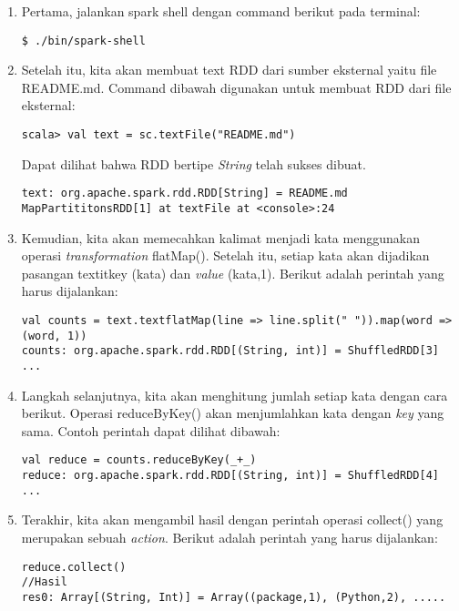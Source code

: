 \begin{enumerate}

\item Pertama, jalankan spark shell dengan command berikut pada terminal:

\begin{verbatim}
$ ./bin/spark-shell
\end{verbatim}

\item Setelah itu, kita akan membuat text RDD dari sumber eksternal yaitu file README.md. Command dibawah digunakan untuk membuat RDD dari file eksternal:

\begin{verbatim}
scala> val text = sc.textFile("README.md") 
\end{verbatim}

Dapat dilihat bahwa RDD bertipe \textit{String} telah sukses dibuat.

\begin{verbatim}
text: org.apache.spark.rdd.RDD[String] = README.md MapPartititonsRDD[1] at textFile at <console>:24
\end{verbatim}


\item Kemudian, kita akan memecahkan kalimat menjadi kata menggunakan operasi \textit{transformation} flatMap(). Setelah itu, setiap kata akan dijadikan pasangan textit{key} (kata) dan \textit{value} (kata,1). Berikut adalah perintah yang harus dijalankan:

\begin{verbatim}
val counts = text.textflatMap(line => line.split(" ")).map(word => (word, 1))
counts: org.apache.spark.rdd.RDD[(String, int)] = ShuffledRDD[3] ...
\end{verbatim}

\item Langkah selanjutnya, kita akan menghitung jumlah setiap kata dengan cara berikut. Operasi reduceByKey() akan menjumlahkan kata dengan \textit{key} yang sama. Contoh perintah dapat dilihat dibawah:  

\begin{verbatim}
val reduce = counts.reduceByKey(_+_)
reduce: org.apache.spark.rdd.RDD[(String, int)] = ShuffledRDD[4] ...
\end{verbatim}

\item Terakhir, kita akan mengambil hasil dengan perintah operasi collect() yang merupakan sebuah \textit{action}. Berikut adalah perintah yang harus dijalankan:

\begin{verbatim}
reduce.collect()
//Hasil
res0: Array[(String, Int)] = Array((package,1), (Python,2), .....
\end{verbatim}

\end{enumerate}

